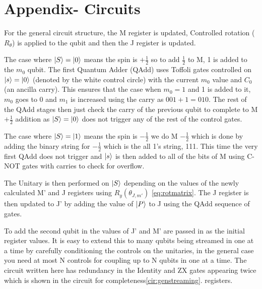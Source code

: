 \appendix
\section{Appendix- Circuits}

For the general circuit structure, the M register is updated, Controlled rotation ($R_\theta$) is applied to the qubit and then the J register is updated.

The case where $\left\vert{S}\right\rangle = \left\vert{0}\right\rangle$ means the spin is $+\frac{1}{2}$ so to add $\frac{1}{2}$ to M, 1 is added to the $m_0$ qubit. The first Quantum Adder (QAdd) uses Toffoli gates controlled on $\left\vert{s}\right\rangle=\left\vert{0}\right\rangle$ (denoted by the white control circle) with the current $m_0$ value and $C_0$ (an ancilla carry). This ensures that the case when $m_0 = 1$ and 1 is added to it, $m_0$ goes to 0 and $m_1$ is increased using the carry as $001+1=010$. The rest of the QAdd stages then just check the carry of the previous qubit to complete to M $+ \frac{1}{2}$ addition as $\left\vert{S}\right\rangle = \left\vert{0}\right\rangle$ does not trigger any of the rest of the control gates.

The case where $\left\vert{S}\right\rangle = \left\vert{1}\right\rangle$ means the spin is $-\frac{1}{2}$ we do M $-\frac{1}{2}$ which is done by adding the binary string for $-\frac{1}{2}$ which is the all 1's string, 111. This time the very first QAdd does not trigger and $\left\vert{s}\right\rangle$ is then added to all of the bits of M using C-NOT gates with carries to check for overflow. 

The Unitary is then performed on $\left\vert{S}\right\rangle$ depending on the values of the newly calculated M' and J registers using $R_y(\theta_{J,m'})$ \autoref{eq:rotmatrix}. The J register is then updated to J' by adding the value of $\left\vert{P}\right\rangle$ to J using the QAdd sequence of gates.

To add the second qubit in the values of J' and M' are passed in as the initial register values. It is easy to extend this to many qubits being streamed in one at a time by carefully conditioning the controls on the unitaries, in the general case you need at most N controls for coupling up to N qubits in one at a time. The circuit written here has redundancy in the Identity and ZX gates appearing twice which is shown in the circuit for completeness\autoref{cir:genstreaming}. 
registers.


